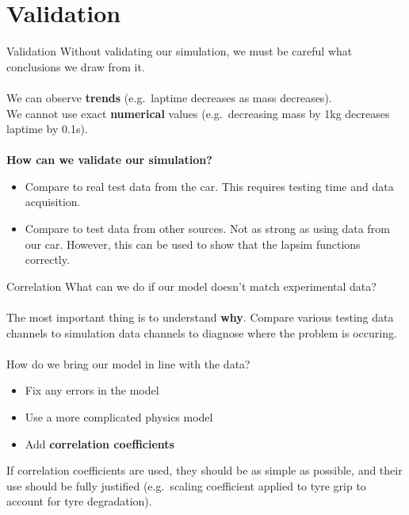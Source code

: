 \section*{Validation}

\begin{frame}{Validation}
    Without validating our simulation,
    we must be careful what conclusions we draw from it.
    \\~\\
    We can observe \textbf{trends}
    (e.g.\ laptime decreases as mass decreases). \\
    We cannot use exact \textbf{numerical} values
    (e.g.\ decreasing mass by 1kg decreases laptime by 0.1s).
    \\~\\
    \textbf{How can we validate our simulation?}
    \begin{itemize}
        \item Compare to real test data from the car.
        This requires testing time and data acquisition.
        \item Compare to test data from other sources.
        Not as strong as using data from our car.
        However, this can be used to show that the lapsim functions correctly.
    \end{itemize}
\end{frame}


\begin{frame}{Correlation}
    What can we do if our model doesn't match experimental data?
    \\~\\
    The most important thing is to understand \textbf{why}.
    Compare various testing data channels to simulation data channels
    to diagnose where the problem is occuring.
    \\~\\
    How do we bring our model in line with the data?
    \begin{itemize}
        \item Fix any errors in the model
        \item Use a more complicated physics model
        \item Add \textbf{correlation coefficients}
    \end{itemize}
    If correlation coefficients are used,
    they should be as simple as possible,
    and their use should be fully justified
    (e.g.\ scaling coefficient applied to tyre grip
    to account for tyre degradation).
\end{frame}